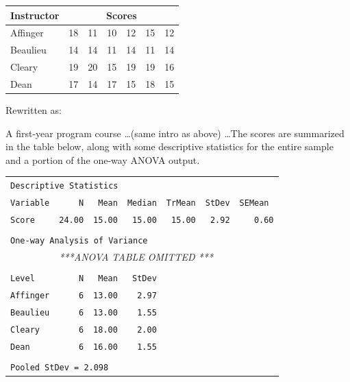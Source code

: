\begin{table}[!ht]
\begin{center}
\begin{tabular}{lllllll}
\textbf{Instructor} & \multicolumn{6}{c}{\textbf{Scores}}\\
  \hline
Affinger & 18 & 11 & 10 & 12 & 15 & 12\\
Beaulieu & 14 & 14 & 11 & 14 & 11 & 14\\
Cleary & 19 & 20 & 15 & 19 & 19 & 16\\
Dean & 17 & 14 & 17 & 15 & 18 & 15\\
\hline
\end{tabular}
\end{center}
\end{table}

\noindent
Rewritten as:


A first-year program course \ldots  (same intro as above) \ldots   The scores are summarized in the table below, along with some descriptive statistics for the entire sample and a portion of the one-way ANOVA output.




\begin{table}[ht]
\begin{center}
\begin{tabular}{lrrrrrr}

\multicolumn{7}{l}{\texttt{Descriptive Statistics}}\\
\texttt{Variable} & \texttt{N} & \texttt{Mean} & \texttt{Median} & \texttt{TrMean} & \texttt{StDev}  & \texttt{SEMean}\ \\ 

\texttt{Score} & \texttt{24.00} & \texttt{15.00} & \texttt{15.00} & \texttt{15.00} & \texttt{2.92}  & \texttt{0.60} \\ 
\\
\multicolumn{7}{l}{\texttt{One-way Analysis of Variance}}\\
& \multicolumn{6}{l}{\textit{***ANOVA TABLE OMITTED ***}}
\\
\\

\texttt{Level} & \texttt{N} & \texttt{Mean} & \texttt{StDev} & & &\\ 

\texttt{Affinger} & \texttt{6} & \texttt{13.00} & \texttt{2.97} & & & \\ 
\texttt{Beaulieu} & \texttt{6} & \texttt{13.00} & \texttt{1.55} & & & \\ 
 \texttt{Cleary} & \texttt{6} & \texttt{18.00} & \texttt{2.00} & & & \\ 
\texttt{Dean} & \texttt{6} & \texttt{16.00} & \texttt{1.55} & & & \\ 
  \\
\multicolumn{7}{l}{\texttt{Pooled StDev = 2.098}}\\


\end{tabular}
\end{center}
\end{table}



